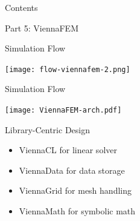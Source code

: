 


\begin{frame}{Contents}
  \begin{center}
   \Large Part 5: ViennaFEM
  \end{center}
\end{frame}


\begin{frame}{Simulation Flow}
  \begin{center}
   \texttt{[image: flow-viennafem-2.png]}
  \end{center}
\end{frame}




\begin{frame}{Simulation Flow}

  \begin{center}
   \texttt{[image: ViennaFEM-arch.pdf]}
  \end{center}
 \begin{block}{Library-Centric Design}
  \begin{itemize}
   \item ViennaCL for linear solver
   \item ViennaData for data storage
   \item ViennaGrid for mesh handling
   \item ViennaMath for symbolic math
  \end{itemize}
 \end{block}
 
 
\end{frame}




